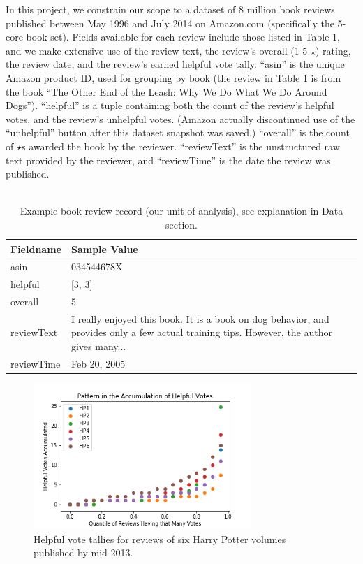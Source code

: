 \documentclass[10pt, a4paper, twocolumn]{article}
\begin{document}
In this project, we constrain our scope to a dataset of 8 million book reviews published between May 1996 and July 2014 on Amazon.com (specifically the 5-core book set)\cite{mcauley_2015}. Fields available for each review include those listed in Table 1, and we make extensive use of the review text, the review's overall (1-5 $\star$) rating, the review date, and the review's earned helpful vote tally.  “asin” is the unique Amazon product ID, used for grouping by book (the review in Table 1 is from the book “The Other End of the Leash: Why We Do What We Do Around Dogs”). “helpful” is a tuple containing both the count of the review’s helpful votes, and the review’s unhelpful votes. (Amazon actually discontinued use of the “unhelpful” button after this dataset snapshot was saved.) “overall” is the count of $\star$s awarded the book by the reviewer. “reviewText” is the unstructured raw text provided by the reviewer, and “reviewTime” is the date the review was  published.
\\
\\
\begin{table}
\begin{tabular}{ | l | p{4cm}| }
  \hline
  Fieldname & Sample Value \\
  \hline
  asin & 034544678X \\
    \hline
  helpful & [3, 3] \\
    \hline
  overall & 5 \\
    \hline
  reviewText & I really enjoyed this book. It is a book on dog behavior, and provides only a few actual training tips. However, the author gives many... \\
    \hline
  reviewTime & Feb 20, 2005 \\
  \hline
\end{tabular}
\caption{Example book review record (our unit of analysis), see explanation in Data section.}
\end{table}

\begin{figure}[ht]
\includegraphics[width=3.25in]{HP_reviews_helpful_vote_accumulation.png}
\caption{Helpful vote tallies for reviews of six Harry Potter volumes published by mid 2013. }
\end{figure}
\end{document}
